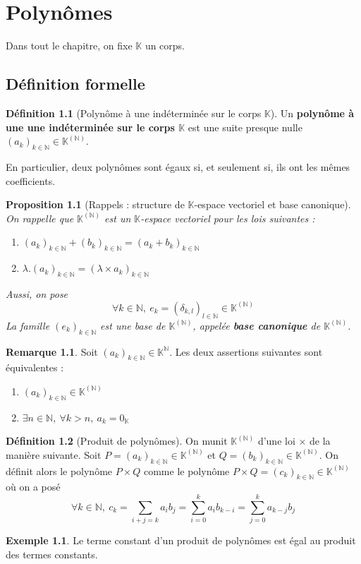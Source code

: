 \documentclass[french]{book}
\newcommand{\N}{\mathbb{N}}
\newcommand{\K}{\mathbb{K}}
\theoremstyle{plain}
\newtheorem{prop}{Proposition}[chapter]
\theoremstyle{definition}
\newtheorem{dfn}{Définition}[chapter]
\newtheorem{exa}{Exemple}[chapter]
\newtheorem{rmq}{Remarque}[chapter]
\theoremstyle{remark}
\begin{document}
\chapter{Polynômes}
Dans tout le chapitre, on fixe $\K$ un corps.
\section{Définition formelle}
\begin{dfn}[Polynôme à une indéterminée sur le corps $\K$]
	Un \textbf{polynôme à une une indéterminée sur le corps $\K$} est une suite presque nulle $(a_k)_{k\in\N}\in\K^{(\N)}$. \\ \par En particulier, deux polynômes sont égaux si, et seulement si, ils ont les mêmes coefficients.
\end{dfn}
\begin{prop}[Rappels : structure de $\K$-espace vectoriel et base canonique]
	On rappelle que $\K^{(\N)}$ est un $\K$-espace vectoriel pour les lois suivantes :
	\begin{enumerate}
		\item $(a_k)_{k\in\N}+(b_k)_{k\in\N}=(a_k+b_k)_{k\in\N}$
		\item $\lambda.(a_k)_{k\in\N}=(\lambda\times a_k)_{k\in\N}$
	\end{enumerate}
	Aussi, on pose $$\forall k\in\N,\ e_k=(\delta_{k,l})_{l\in\N}\in\K^{(\N)}$$ La famille $(e_k)_{k\in\N}$ est une base de $\K^{(\N)}$, appelée \textbf{base canonique} de $\K^{(\N)}$.
\end{prop}
\begin{rmq} Soit $(a_k)_{k\in\N}\in\K^\N$. Les deux assertions suivantes sont équivalentes :
	\begin{enumerate}
		\item $(a_k)_{k\in\N}\in\K^{(\N)}$
		\item $\exists n\in\N,\ \forall k>n,\ a_k=0_\K$
\end{enumerate} \end{rmq}
\begin{dfn}[Produit de polynômes]
	On munit $\K^{(\N)}$ d'une loi $\times$ de la manière suivante. Soit $P=(a_k)_{k\in\N}\in\K^{(\N)}$ et $Q=(b_k)_{k\in\N}\in\K^{(\N)}$. On définit alors le polynôme $P\times Q$ comme le polynôme $P\times Q=(c_k)_{k\in\N}\in\K^{(\N)}$ où on a posé $$\forall k\in\N,\ c_k=\sum_{i+j=k}a_ib_j=\sum_{i=0}^{k}a_ib_{k-i}=\sum_{j=0}^{k}a_{k-j}b_j$$
\end{dfn}
\begin{exa}
	Le terme constant d'un produit de polynômes est égal au produit des termes constants.
\end{exa}
\end{document}
